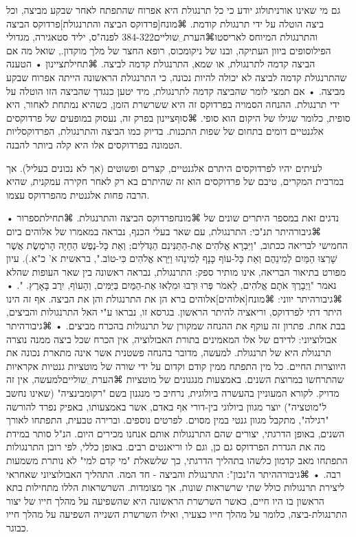 ﻿גם מי שאינו אורניתולוג יודע כי כל תרנגולת היא אפרוח שהתפתח לאחר שבקע מביצה, וכל ביצה הוטלה על ידי תרנגולת קודמת. ⌘מונח[פרדוקס הביצה והתרנגולת]{פרדוקס הביצה והתרנגולת} המיוחס לאריסטו⌘הערת␣שוליים{384-322 לפנה"ס, יליד סטאגירה, מגדולי הפילוסופים ביוון העתיקה, ובנו של ניקומכוס, רופא החצר של מלך מוקדון.}, שואל מה אם הביצה קדמה לתרנגולת, או שמא, התרנגולת קדמה לביצה. 
⌘תחילת{ציינון}
• הטענה שהתרנגולת קדמה לביצה לא יכולה להיות נכונה, כי  התרנגולת הראשונה הייתה אפרוח שבקע מביצה.
• אם תמצי לומר שהביצה קדמה לתרנגולת, מיד יטען כנגדך שהביצה הזו הוטלה על ידי תרנגולת. 
ההנחה הסמויה בפרדוקס זה היא ששרשרת הזמן, כשהיא נמתחת לאחור, היא סופית, כלומר שגילו של היקום הוא סופי.
⌘סוף{ציינון}
בפרק זה, נעסוק במופעים של פרדוקסים אלגנטיים דומים בתחום של שפות התכנות. בדיוק כמו הביצה והתרנגולת, הפרדוקסליות הטמונה בפרדוקסים אלו היא קלה ביותר להבנה. 

לעיתים יהיו לפרדוקסים היתרם אלגנטיים, קצרים ופשוטים (אך לא נכונים בעליל). אך במרבית המקרים, טיבם של פרדוקסים הוא זה שהיתרם בא רק לאחר חקירה עמקנית, שהיא הרבה פחות אלגנטית מהפרדוקס עצמו.

נדגים זאת במספר היתרים שונים של ⌘מונח{פרדוקס הביצה והתרנגולת}. 
⌘תחילת{ספרור}
• ⌘גיבור{היתר תנ"כי:} התרנגולת, עם שאר בעלי הכנף, נבראה במאמרו של אלוהים ביום החמישי לבריאה ככתוב, "וַיִּבְרָא אֱלֹהִים אֶת-הַתַּנִּינִם הַגְּדֹלִים; וְאֵת כָּל-נֶפֶשׁ הַחַיָּה הָרֹמֶשֶׂת אֲשֶׁר שָׁרְצוּ הַמַּיִם לְמִינֵהֶם וְאֵת כָּל-עוֹף כָּנָף לְמִינֵהוּ וַיַּרְא אֱלֹהִים כִּי-טוֹב.", בראשית א' כ"א.). עיון מפורט בתיאור הבריאה, אינו מותיר ספק: התרנגולת, נבראה ראשונה בין שאר העופות שהלא נאמר "וַיְבָרֶךְ אֹתָם אֱלֹהִים, לֵאמֹר  פְּרוּ וּרְבוּ וּמִלְאוּ אֶת-הַמַּיִם בַּיַּמִּים, וְהָעוֹף, יִרֶב בָּאָרֶץ. ". 
• ⌘גיבור{היתר יווני:} ⌘מונח[אלוהים]{אלוהים} ברא הן את התרנגולת והן את הביצה. אף זה הינו היתר דתי לפרדוקס, וריאציה להיתר הראשון. בגרסא זו, נבראו ע"י האל התרנגולות והביצים, בבת אחת. פתרון זה עוקף את ההנחה שמקורן של תרנגולות בהכרח מביצים.
• ⌘גיבור{היתר אבולוציוני:} לדידם של אלו המאמינים בתורת האבולוציה, אין הכרח שכל ביצה ממנה נוצרה תרנגולת היא של תרנגולת. למעשה, מדובר בהנחה פשטנית אשר אינה מתארת נכונה את היווצרות החיים. כל מין התפתח ממין קודם וקדום על ידי שורה של מוטציות גנטיות אקראיות שהתרחשו במרוצת השנים. באמצעות מנגנונים של מוטציות ⌘הערת␣שוליים{למעשה, אין זה מדויק. לקורא המעוניין בהעשרה ביולוגית, נרחיב כי מנגנון בשם "רקומבינציה" (שאינו נחשב ל"מוטציה") יוצר מגוון ביולוגי בין-דורי אף באדם, אשר באמצעותו, באפיק נפרד להורשה "רגילה", מתקבל מגוון גנטי במין מסוים. לפרטים נוספים.} וברירה טבעית, התפתחו לאורך השנים, באופן הדרגתי, יצורים שהם התרנגולות אותם אנחנו מכירים היום. הנ"ל סותר במידת מה את הגדרת הפרדוקס גם כן, וגם לו וריאנטים רבים. באופן כללי, לפי רובן התרנגולות התפתחו מאב קדמון כלשהו בתהליך הדרגתי, כך שלשאלת "מי קדם למי" לא נותרת משמעות רבה. 
• ⌘גיבור{ההיתר ה"נכון":} התרנגולת והביצה - חד המה. התהליך האבולוציוני שאחראי ליצירת תרנגולות כולל שתי שרשראות שונות, אך מצומדות. השרשראות הללו מתחילות בתא הראשון בו היו חיים, כאשר השרשרת הראשונה היא שהשפיעה על מהלך חייו של יצור התרנגולת-ביצה, כלומר על מהלך חייו כצעיר, ואילו השרשרת השנייה השפיעה על מהלך חייו כבוגר.


